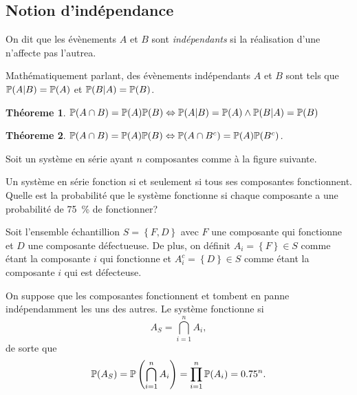 \documentclass[11pt]{article}
\renewcommand\P{%
	\ensuremath{%
		\mathbb{P}%
	}%
}%
\newtheorem{theoreme}{Théoreme}[section]
\begin{document}
\subsection{Notion d'indépendance}
\begin{definition}
	On dit que les évènements $A$ et $B$ sont \textit{indépendants} si la
	réalisation d'une n'affecte pas l'autrea.
\end{definition}

Mathématiquement parlant, des évènements indépendants $A$ et $B$ sont tels que
$\P(A|B)=\P(A)$ et $\P(B|A)=\P(B)$.

\begin{theoreme}
	$\P(A\cap B)=\P(A)\P(B)\Leftrightarrow \P(A|B)=\P(A)\wedge \P(B|A)=\P(B)$
\end{theoreme}

\begin{theoreme}
	$\P(A\cap B)=\P(A)\P(B)\Leftrightarrow \P(A\cap B^c)=\P(A)\P(B^c)$.
\end{theoreme}

\begin{exemple}
	Soit un système en série ayant $n$ composantes comme à la figure suivante.
	\begin{figure}[H]
		\centering
		
	\end{figure}
	Un système en série fonction si et seulement si tous ses composantes
	fonctionnent. Quelle est la probabilité que le système fonctionne si chaque
	composante a une probabilité de \SI{75}{\percent} de fonctionner?

	Soit l'ensemble échantillion $S=\left\{F,D\right\}$ avec $F$ une composante
	qui fonctionne et $D$ une composante défectueuse. De plus, on définit
	$A_i=\left\{F\right\}\in S$ comme étant la composante $i$ qui fonctionne et
	$A_i^c=\left\{D\right\}\in S$ comme étant la composante $i$ qui est
	défecteuse.

	On suppose que les composantes fonctionnent et tombent en panne
	indépendamment les uns des autres. Le système fonctionne si
	\begin{equation*}
		A_S=\bigcap_{i=1}^nA_i,
	\end{equation*}
	de sorte que
	\begin{equation*}
		\P(A_S)
		=\P\left(\bigcap_{i=1}^nA_i\right)
		=\prod_{i=1}^n\P(A_i)
		=\SI{0.75}{}^n.
	\end{equation*}
\end{exemple}
\end{document}
